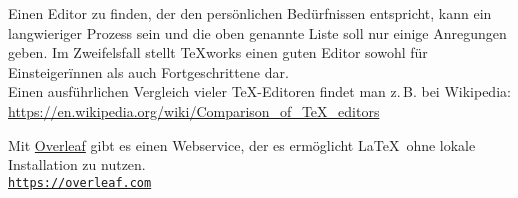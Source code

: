 \documentclass[
	ausgabe=2023-02-08,
	titel=Installationshinweise,
	shortverb=true,
]{../tex/latexkurs-exercise}
\begin{document}
\noindent Einen Editor zu finden, der den persönlichen Bedürfnissen entspricht, kann ein langwieriger Prozess sein und die oben genannte Liste soll nur einige Anregungen geben. Im Zweifelsfall stellt \TeX works  einen guten Editor sowohl für Einsteigerïnnen als auch Fortgeschrittene dar.\\Einen ausführlichen Vergleich vieler \TeX-Editoren findet man z.\,B. bei Wikipedia:\\ \url{https://en.wikipedia.org/wiki/Comparison_of_TeX_editors}

Mit \href{https://qn3.de/tex00}{Overleaf}  gibt es einen Webservice, der es ermöglicht \LaTeX\ ohne lokale Installation zu nutzen.\\ \href{https://qn3.de/tex00}{\texttt{https://overleaf.com}}
\end{document}
